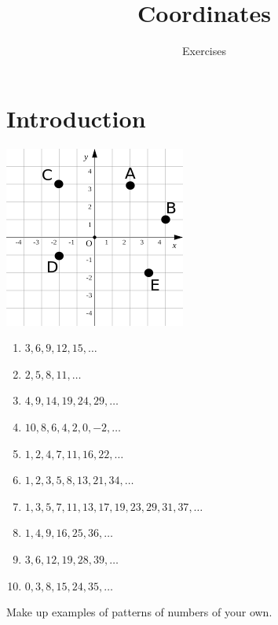 \documentclass[11pt]{article}
\title{Coordinates}
\author{Exercises}
\begin{document}
\maketitle
\section*{Introduction}
\includegraphics{4-Coordinates-Fig1.png}
\begin{enumerate}
	\item $3, 6, 9, 12, 15, \ldots$
	\item $2, 5, 8, 11, \ldots$
	\item $4, 9, 14, 19, 24, 29, \ldots$
	\item $10, 8, 6, 4, 2, 0, -2, \ldots$
	\item $1, 2, 4, 7, 11, 16, 22, \ldots$
	\item $1, 2, 3, 5, 8, 13, 21, 34, \ldots$
	\item $1, 3, 5, 7, 11, 13, 17, 19, 23, 29, 31, 37,\ldots$
	\item $1, 4, 9, 16, 25, 36, \ldots$
	\item $3, 6, 12, 19, 28, 39, \ldots$
	\item $0, 3, 8, 15, 24, 35, \ldots$
\end{enumerate}

Make up examples of patterns of numbers of your own.
\end{document}
